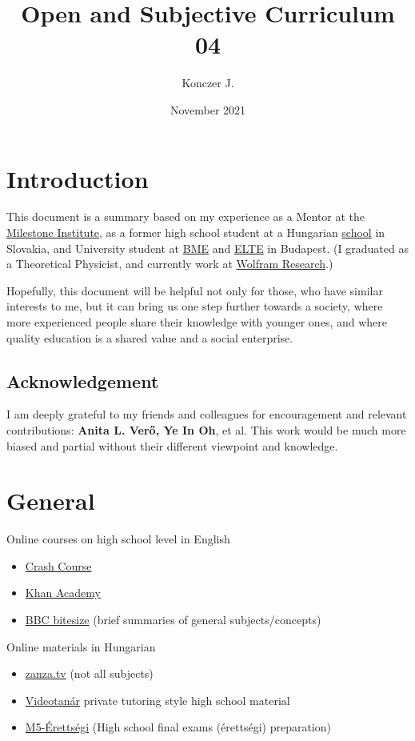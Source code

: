 \documentclass{article}
\title{Open and Subjective Curriculum \\ 04}
\author{Konczer J.}
\date{November 2021}
\begin{document}
\maketitle

\section*{}

\section{Introduction}

This document is a summary based on my experience as a Mentor at the \href{https://milestone-institute.org/}{Milestone Institute}, as a former high school student at a Hungarian \href{http://selye.gartproject.com/}{school} in Slovakia, and University student at \href{https://www.bme.hu/?language=en}{BME} and \href{https://www.elte.hu/en/}{ELTE} in Budapest.
(I graduated as a Theoretical Physicist, and currently work at \href{https://www.wolfram.com/}{Wolfram Research}.)

Hopefully, this document will be helpful not only for those, who have similar interests to me, but it can bring us one step further towards a society, where more experienced people share their knowledge with younger ones, and where quality education is a shared value and a social enterprise.

\subsection{Acknowledgement}

I am deeply grateful to my friends and colleagues for encouragement and relevant contributions:
{\bf Anita L. Verő, Ye In Oh},
et al.
This work would be much more biased and partial without their different viewpoint and knowledge.

\section{General}

Online courses on high school level in English
\begin{itemize}
\item \href{https://thecrashcourse.com/}{Crash Course}
\item \href{https://www.khanacademy.org/}{Khan Academy}
\item \href{https://www.bbc.co.uk/bitesize/levels/z98jmp3}{BBC bitesize} (brief summaries of general subjects/concepts)
\end{itemize}
Online materials in Hungarian
\begin{itemize}
    \item \href{https://zanza.tv/}{zanza.tv} (not all subjects)
    \item \href{https://www.youtube.com/user/videotanar/}{Videotanár} private tutoring style high school material
    \item \href{https://www.youtube.com/playlist?list=PLEiwVd6n_Q_38BxQQDqYZE6bdMQAZxbX2}{M5-Érettségi} (High school final exams (érettségi) preparation)
\end{itemize}
\end{document}
